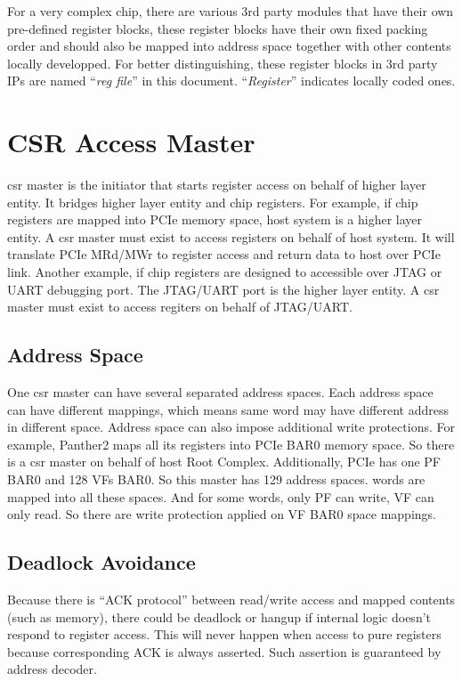 \documentclass[10pt,oneside]{book}
\begin{document}
For a very complex chip, there are various 3rd party modules that have their
own pre-defined register blocks, these register blocks have their own fixed
packing order and should also be mapped into address space together with other
contents locally developped. For better distinguishing,  these register blocks 
in 3rd party IPs are named ``\emph{\gls{reg file}}'' in this document. ``\emph{Register}''
indicates locally coded ones. 

\section{CSR Access Master}
\gls{csr master} is the initiator that starts register access on 
behalf of higher layer entity. It bridges higher layer entity and
chip registers. 
For example, if chip registers are
mapped into PCIe memory space, host system is a higher layer entity. 
A \gls{csr master} must exist to access registers on behalf of 
host system. It will translate PCIe MRd/MWr to register access and 
return data to host over PCIe link. 
Another example, if chip registers are designed to accessible over
JTAG or UART debugging port. The JTAG/UART port is the higher 
layer entity. A \gls{csr master} must exist to access regiters on behalf 
of JTAG/UART. 

\subsection{Address Space}
One \gls{csr master} can have several separated address spaces. Each
address space can have different mappings, which means same \gls{word}
may have different address in different space. Address space can also
impose additional write protections. For example, Panther2 maps all its 
registers into PCIe BAR0 memory space. So there is a \gls{csr master}
on behalf of host Root Complex. Additionally, PCIe has one PF BAR0 and 
128 VFs BAR0. So this master has 129 address spaces. \gls{word}s are
mapped into all these spaces. And for some \gls{word}s, only PF can 
write, VF can only read. So there are write protection applied on 
VF BAR0 space mappings. 
\subsection{Deadlock Avoidance}\label{sec:deadlock avoidance}
Because there is ``ACK protocol'' between read/write access and 
mapped contents (such as memory), there could be deadlock or hangup 
if internal logic doesn't respond to register access. This will never
happen when access to pure registers because corresponding ACK is 
always asserted. Such assertion is guaranteed by address decoder. 
\end{document}
